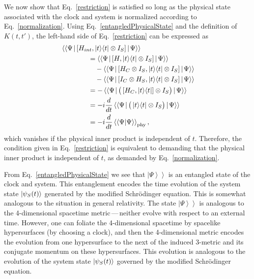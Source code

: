 \documentclass[a4paper,twocolumn,superscriptaddress,11pt,accepted=2019-06-04]{quantumarticle}
\newcommand{\kket}[1]{\left| \left. #1 \right> \right>} 		%
\newcommand{\bbra}[1]{\left< \left<  #1 \right. \right|} 	%
\newcommand{\nn}{\nonumber}		%
\begin{document}
{We now show that Eq.~\eqref{restriction} is satisfied so long as the physical state associated with the clock and system is normalized according to Eq.~\eqref{normalization}. Using Eq.~\eqref{entangledPhysicalState} and the definition of $K(t,t')$, the left-hand side of Eq.~\eqref{restriction} can be expressed as
\begin{align}
&\bbra{\Psi} \left[  H_{int}, \ket{t}\!\bra{t} \otimes I_S \right] \kket{\Psi}\nn\\
&\qquad \qquad = \bbra{\Psi} \left[ H, \ket{t}\!\bra{t} \otimes I_S \right] \kket{\Psi} \nn \\
&\qquad  \qquad \quad - \bbra{\Psi} \left[ H_C \otimes I_S , \ket{t}\!\bra{t} \otimes I_S \right] \kket{\Psi} \nn \\
& \qquad \qquad \quad - \bbra{\Psi} \left[  I_C \otimes H_S, \ket{t}\!\bra{t} \otimes I_S \right] \kket{\Psi} \nn \\
&\qquad \qquad = - \bbra{\Psi} \big( \left[ H_C, \ket{t}\!\bra{t}\right]  \otimes I_S  \big) \kket{\Psi} \nn \\
&\qquad \qquad = -i \frac{d}{dt} \bbra{\Psi} \big( \ket{t}\!\bra{t}  \otimes I_S \big) \kket{\Psi} \nn \\
&\qquad \qquad = -i \frac{d}{dt} \braket{\braket{\Psi| \Psi}}_{\rm phy}, \nn
\end{align}
which vanishes if the physical inner product is independent of $t$. Therefore, the condition given in Eq.~\eqref{restriction} is equivalent to demanding that the physical inner product is independent of $t$, as demanded by Eq.~\eqref{normalization}.

From Eq.~\eqref{entangledPhysicalState} we see that $\kket{\Psi}$ is an entangled state of the clock and system. This entanglement encodes the time evolution of the system state $\ket{\psi_S(t)}$ generated by the modified Schr\"{o}dinger equation. This is somewhat analogous to the situation in general relativity. The state $\kket{\Psi}$ is analogous to the 4-dimensional spacetime metric\,---\,neither evolve with respect to an external time. However, one can foliate the 4-dimensional spacetime by spacelike hypersurfaces (by choosing a clock), and then the 4-dimensional metric encodes the evolution from one hypersurface to the next of the induced 3-metric and its conjugate momentum on these hypersurfaces. This evolution is analogous to the evolution of the system state $\ket{\psi_S(t)}$ governed by the modified Schr\"{o}dinger equation.




}
\end{document}
